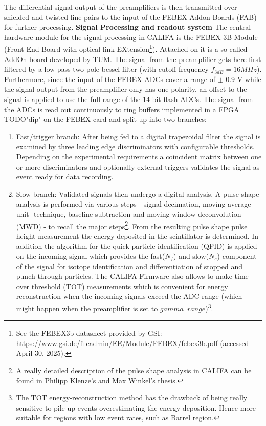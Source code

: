 The differential signal output of the preamplifiers is then transmitted over shielded and twisted line pairs to the input of the FEBEX Addon Boards (FAB) for further processing.\newline
\textbf{Signal Processing and readout system}\newline
The central hardware module for the signal processing in CALIFA is the FEBEX 3B Module (Front End Board with optical link EXtension\footnote{See the FEBEX3b datasheet provided by GSI: \url{https://www.gsi.de/fileadmin/EE/Module/FEBEX/febex3b.pdf} (accessed April 30, 2025).}). Attached on it is a so-called AddOn board developed by TUM. The signal from the preamplifier gets here first filtered by a low pass two pole bessel filter (with cutoff frequency $f_{3dB} = 16 MHz$). Furthermore, since the input of the FEBEX ADCs cover a range of $\pm$ 0.9 V while the signal output from the preamplifier only has one polarity, an offset to the signal is applied to use the full range of the 14 bit flash ADCs. The signal from the ADCs is read out continuously to ring buffers implemented in a FPGA TODO"dip" on the FEBEX card and split up into two branches:\newline
\begin{enumerate}
\item Fast/trigger branch: After being fed to a digital trapezoidal filter the signal is examined by three leading edge discriminators with configurable thresholds. Depending on the experimental requirements a coincident matrix between one or more discriminators and optionally external triggers validates the signal as event ready for data recording.
\item Slow branch: Validated signals then undergo a digital analysis. A pulse shape analysis is performed via various steps - signal decimation, moving average unit -technique, baseline subtraction and moving window deconvolution (MWD) - to recall the major steps\footnote{A really detailed description of the pulse shape analysis in CALIFA can be found in Philipp Klenze's\cite{pklenze} and Max Winkel's thesis\cite{winkel2016komplexe}.}. From the resulting pulse shape pulse height measurement the energy deposited in the scintillator is determined. In addition the algorithm for the quick particle identification (QPID) is applied on the incoming signal which provides the fast($N_{f}$) and slow($N_{s}$) component of the signal for isotope identification and differentiation of stopped and punch-through particles. The CALIFA Firmware also allows to make time over threshold (TOT) measurements which is convenient for energy reconstruction when the incoming signals exceed the ADC range (which might happen when the preamplifier is set to $gamma \enspace range$)\footnote{The TOT energy-reconstruction method has the drawback of being really sensitive to pile-up events overestimating the energy deposition. Hence more suitable for regions with low event rates, such as Barrel region.}.
\end{enumerate}

